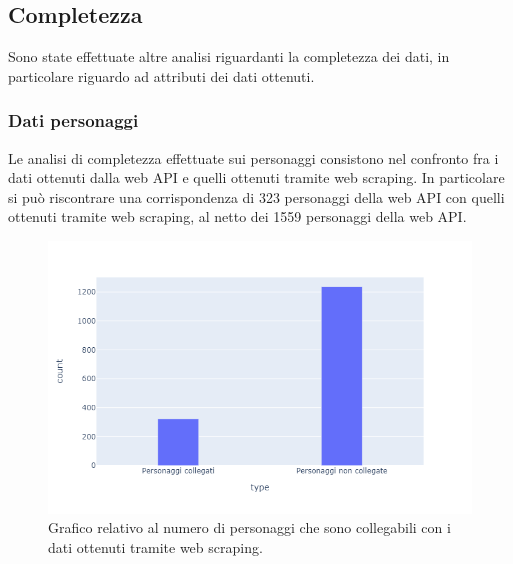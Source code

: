 \documentclass[
12pt, %
a4paper, %
oneside, %
headinclude,footinclude, %
BCOR5mm, %
]{scrartcl}
\begin{document}
\subsection{Completezza}
Sono state effettuate altre analisi riguardanti la completezza dei dati, in particolare riguardo ad attributi dei dati ottenuti.
\subsubsection{Dati personaggi}
Le analisi di completezza effettuate sui personaggi consistono nel confronto fra i dati ottenuti dalla web API e quelli ottenuti tramite web scraping. In particolare si può riscontrare una corrispondenza di 323 personaggi della web API con quelli ottenuti tramite web scraping, al netto dei 1559 personaggi della web API.
\begin{figure}[H]
  \includegraphics[scale=0.5]{./Figures/plot_corrispondenza_personaggi.png}
  \caption{Grafico relativo al numero di personaggi che sono collegabili con i dati ottenuti tramite web scraping.}
\end{figure}
\end{document}
